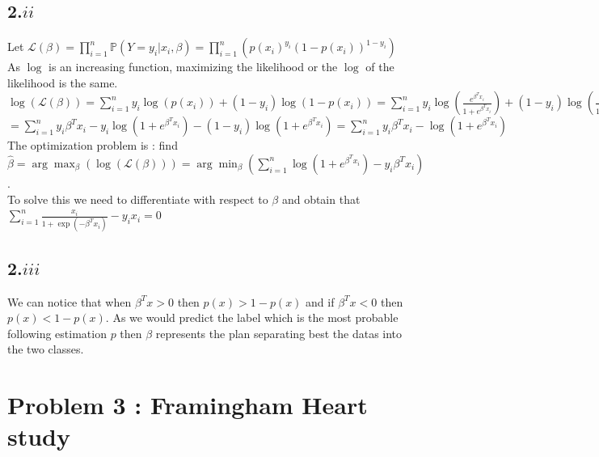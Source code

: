 \documentclass{article}
\begin{document}
    \subsection*{2.$ii$}
    Let 
    $\mathcal{L}(\beta) = \prod_{i=1}^n \mathbb{P}(Y=y_i|x_i,\beta) = \prod_{i=1}^n(p(x_i)^{y_i}(1-p(x_i))^{1-y_i})$\\
    As $\log$ is an increasing function, maximizing the likelihood or the $\log$ of the likelihood is the same.\\
    $\log(\mathcal{L}(\beta)) = \sum_{i=1}^n y_i\log(p(x_i))+(1-y_i)\log(1-p(x_i)) = \sum_{i=1}^n y_i \log(\frac{e^{\beta^Tx_i}}{1+e^{\beta^Tx_i}}) + (1-y_i)\log(\frac{1}{1+e^{\beta^Tx_i}})$\\
    $ = \sum_{i=1}^ny_i\beta^Tx_i-y_i\log(1+e^{\beta^T x_i})-(1-y_i)\log(1+e^{\beta^Tx_i}) = \sum_{i=1}^n y_i\beta^Tx_i-\log(1+e^{\beta^Tx_i})$\\
    The optimization problem is : find $\hat{\beta} = \arg\max_{\beta}(\log(\mathcal{L}(\beta))) = \arg\min_{\beta}(\sum_{i=1}^n\log(1+e^{\beta^Tx_i})-y_i\beta^Tx_i)$.
    \\
    To solve this we need to differentiate with respect to $\beta$ and obtain that $\sum_{i=1}^n \frac{x_i}{1+\exp(-\beta^Tx_i)} - y_ix_i = 0 $
    \subsection*{2.$iii$}
    We can notice that when $\beta^Tx > 0$ then $p(x)>1-p(x)$ and if  $\beta^Tx < 0$ then $p(x)<1-p(x)$.
     As we would predict the label which is the most probable following estimation $p$ then $\beta$ represents the plan
     separating best the datas into the two classes.
    \section*{Problem 3 : Framingham Heart study}
\end{document}
